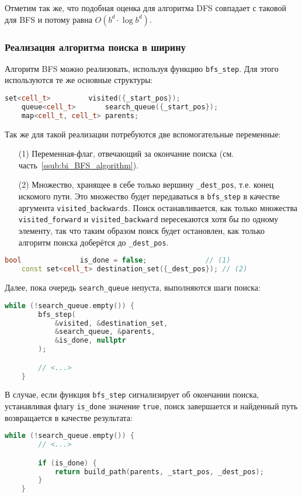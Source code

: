 \documentclass[a4paper, 12pt]{article}
\begin{document}
Отметим так же, что подобная оценка для алгоритма DFS совпадает с таковой для BFS и потому равна \({ O(b^{d} \cdot \log b^d) }\).

\subsubsection{Реализация алгоритма поиска в ширину}
\label{ssub:BFS_implementation}
Алгоритм BFS можно реализовать, используя функцию \verb|bfs_step|. Для этого используются те же основные структуры:
\begin{lstlisting}[language=C++]
    set<cell_t>         visited({_start_pos});
    queue<cell_t>       search_queue({_start_pos});
    map<cell_t, cell_t> parents;
\end{lstlisting}

Так же для такой реализации потребуются две вспомогательные переменные:
\begin{itemize}
    \item[(1)] Переменная-флаг, отвечающий за окончание поиска (см. часть~\ref{ssub:bi_BFS_algorithm}).
    \item[(2)] Множество, хранящее в себе только вершину \verb|_dest_pos|, т.е. конец искомого пути. Это множество будет передаваться в \verb|bfs_step| в качестве аргумента \verb|visited_backwards|. Поиск останавливается, как только множества \verb|visited_forward| и \verb|visited_backward| пересекаются хотя бы по одному элементу,  так что таким образом поиск будет остановлен, как только алгоритм поиска доберётся до \verb|_dest_pos|.
\end{itemize}
\begin{lstlisting}[language=C++]
    bool              is_done = false;              // (1)
    const set<cell_t> destination_set({_dest_pos}); // (2)
\end{lstlisting}

Далее, пока очередь \verb|search_queue| непуста, выполняются шаги поиска:
\begin{lstlisting}[language=C++]
    while (!search_queue.empty()) {
        bfs_step(
            &visited, &destination_set,
            &search_queue, &parents,
            &is_done, nullptr
        );

        // <...>
    }
\end{lstlisting}

В случае, если функция \verb|bfs_step| сигнализирует об окончании поиска, устанавливая флагу \verb|is_done| значение \verb|true|, поиск завершается и найденный путь возвращается в качестве результата:
\begin{lstlisting}[language=C++]
    while (!search_queue.empty()) {
        // <...>

        if (is_done) {
            return build_path(parents, _start_pos, _dest_pos);
        }
    }
\end{lstlisting}
\end{document}
